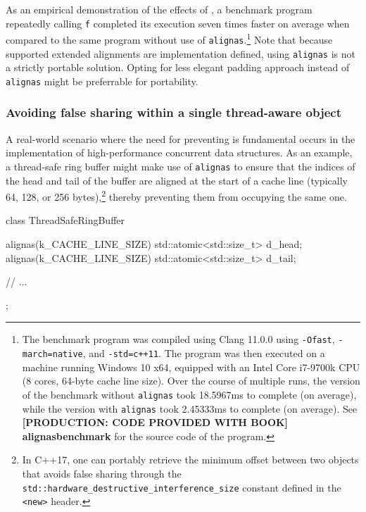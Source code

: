 \noindent As an empirical demonstration of the effects of ,
a benchmark program repeatedly calling \lstinline!f! completed its
execution seven times faster on average when compared to the same
program without use of \lstinline!alignas!.{\cprotect\footnote{The benchmark
program was compiled using Clang 11.0.0 using \lstinline!-Ofast!,
\lstinline!-march=native!, and \mbox{\lstinline!-std=c++11!}. The program was then
executed on a machine running Windows 10 x64, equipped with an Intel
Core i7-9700k CPU (8 cores, 64-byte cache line size). Over the
course of multiple runs, the version of the benchmark without
\lstinline!alignas! took 18.5967ms to complete (on average), while the
version with \lstinline!alignas! took 2.45333ms to complete (on average).
  See \textbf{{[PRODUCTION: CODE PROVIDED WITH BOOK] alignasbenchmark}} for the source code of the program.}} Note that because supported extended alignments are implementation defined, using \lstinline!alignas! is not a strictly portable solution. Opting for less elegant padding approach instead of \lstinline!alignas! might be preferrable for portability.

\subsubsection[Avoiding false sharing within a single thread-aware object]{Avoiding false sharing within a single thread-aware object}\label{avoiding-false-sharing-within-a-single-thread-aware-object}

A real-world scenario where the need for preventing  is fundamental occurs in the implementation of high-performance
concurrent data structures. As an example, a thread-safe ring buffer
might make use of \lstinline!alignas! to ensure that the indices of the
head and tail of the buffer are aligned at the start of a cache line
(typically 64, 128, or 256 bytes),\footnote{In C++17, one can portably retrieve the minimum offset between two objects that avoids false sharing through the \lstinline!std::hardware_destructive_interference_size! constant defined in the \lstinline!<new>! header.}  thereby preventing them from
occupying the same one.

\begin{emcppslisting}
class ThreadSafeRingBuffer
{
    alignas(k_CACHE_LINE_SIZE) std::atomic<std::size_t> d_head;
    alignas(k_CACHE_LINE_SIZE) std::atomic<std::size_t> d_tail;

    // ...
};
\end{emcppslisting}
    
